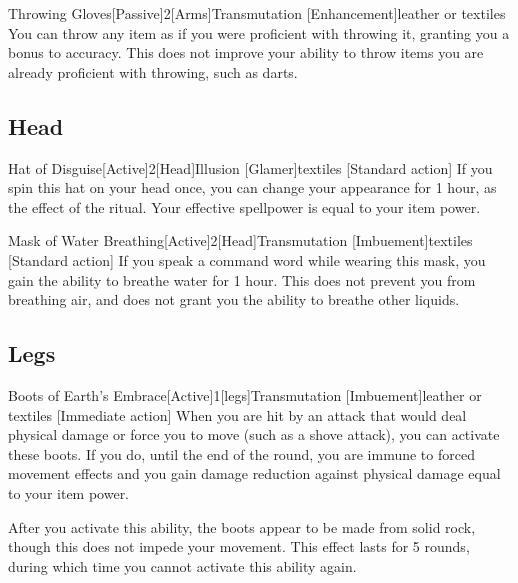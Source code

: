         \begin{magicitemdef}{Throwing Gloves}[Passive]{2}[Arms]{Transmutation [Enhancement]}{leather or textiles}
             You can throw any item as if you were proficient with throwing it, granting you a  bonus to accuracy.
            This does not improve your ability to throw items you are already proficient with throwing, such as darts.
        \end{magicitemdef}

    \subsection{Head}

        \begin{magicitemdef}{Hat of Disguise}[Active]{2}[Head]{Illusion [Glamer]}{textiles}
            [Standard action] If you spin this hat on your head once, you can change your appearance for 1 hour, as the effect of the  ritual.
            Your effective spellpower is equal to your item power.
        \end{magicitemdef}

        \begin{magicitemdef}{Mask of Water Breathing}[Active]{2}[Head]{Transmutation [Imbuement]}{textiles}
            [Standard action] If you speak a command word while wearing this mask, you gain the ability to breathe water for 1 hour.
            This does not prevent you from breathing air, and does not grant you the ability to breathe other liquids.
        \end{magicitemdef}

    \subsection{Legs}

        \begin{magicitemdef}{Boots of Earth's Embrace}[Active]{1}[legs]{Transmutation [Imbuement]}{leather or textiles}
            [Immediate action] When you are hit by an attack that would deal physical damage or force you to move (such as a shove attack), you can activate these boots.
            If you do, until the end of the round, you are immune to forced movement effects and you gain damage reduction against physical damage equal to your item power.

            After you activate this ability, the boots appear to be made from solid rock, though this does not impede your movement.
            This effect lasts for 5 rounds, during which time you cannot activate this ability again.
        \end{magicitemdef}

